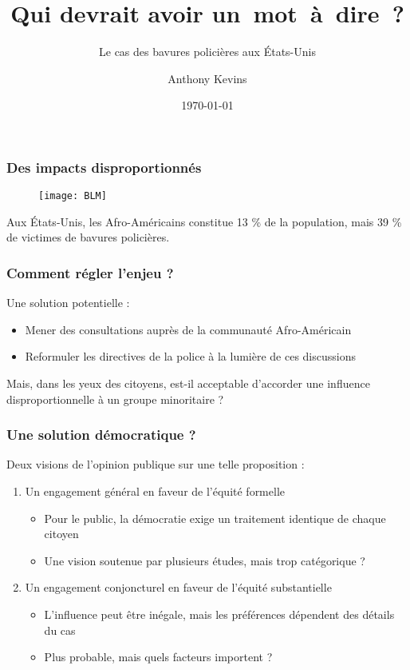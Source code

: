 \documentclass[14pt]{beamer}
\title{Qui devrait avoir un~mot~à~dire~?}
\subtitle{Le cas des bavures policières aux États-Unis}
\author{Anthony Kevins}
\institute{École de gouvernance\\
	Université d’Utrecht}
\date{\today}
\begin{document}
\begin{frame}
\titlepage
\end{frame}

\begin{frame}
	\frametitle{Des impacts disproportionnés}
	\begin{figure}
		\texttt{[image: BLM]}
	\end{figure}
	Aux États-Unis, les Afro-Américains constitue 13 \% de la population, mais 39 \% de victimes de bavures policières.\\
\end{frame}

\begin{frame}
\frametitle{Comment régler l'enjeu ?}
Une solution potentielle : 

\begin{itemize}
	\pause
	\item Mener des consultations auprès de la communauté Afro-Américain 
	\pause
	\item Reformuler les directives de la police à la lumière de ces discussions
\end{itemize}
\pause
\bigskip
Mais, dans les yeux des citoyens, est-il acceptable d'accorder une influence disproportionnelle à un groupe minoritaire ?
\end{frame}

\begin{frame}
\frametitle{Une solution démocratique ?}
Deux visions de l'opinion publique sur une telle proposition :
\begin{enumerate}
	\pause 
	\item Un engagement général en faveur de l'équité formelle
	\begin{itemize}
		\pause 
		\item Pour le public, la démocratie exige un traitement identique de chaque citoyen
		\pause
		\item Une vision soutenue par plusieurs études, mais trop catégorique ?
	\end{itemize}
	\pause 
	\item Un engagement conjoncturel en faveur de l'équité substantielle
	\begin{itemize}
		\pause 
		\item L'influence peut être inégale, mais les préférences dépendent des détails du cas 
		\pause 
		\item Plus probable, mais quels facteurs importent ?
	\end{itemize}
\end{enumerate}
\end{frame}
\end{document}
